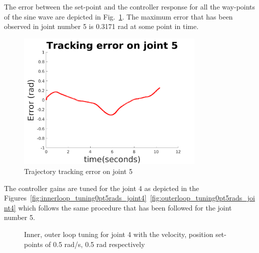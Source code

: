 The error between the set-point and the controller response for all the way-points of the sine wave are depicted in Fig.~\ref{fig:trajectorytrackingerrorjoint5}. The maximum error that has been observed in joint number 5 is 0.3171 rad at some point in time. 

\begin{figure}[H]
\centering
\includegraphics[width=90mm, trim=0 20 0 20]{pictures/joint5_trajectoryerror}
\caption{Trajectory tracking error on joint 5}
\label{fig:trajectorytrackingerrorjoint5}
\end{figure}

The controller gains are tuned for the joint 4 as depicted in the Figures~\ref{fig:innerloop_tuning0pt5rads_joint4}~\ref{fig:outerloop_tuning0pt5rads_joint4} which follows the same procedure that has been followed for the joint number 5. 

\begin{figure}[H]
\centering     %
{}
\caption{Inner, outer loop tuning for joint 4 with the velocity, position set-points of 0.5 rad/s, 0.5 rad respectively}
\end{figure}

